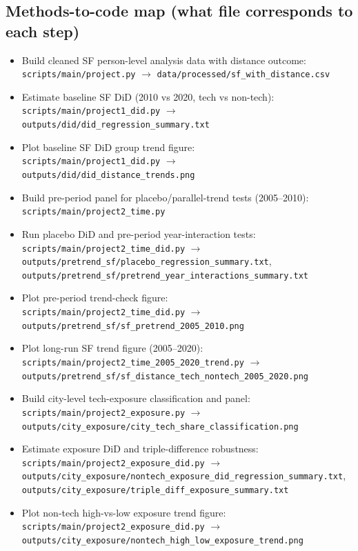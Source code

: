 \documentclass[12pt]{article}
\begin{document}
\subsection*{Methods-to-code map (what file corresponds to each step)}
\begin{itemize}[leftmargin=*]
\item Build cleaned SF person-level analysis data with distance outcome:
\\ \texttt{scripts/main/project.py} $\rightarrow$ \texttt{data/processed/sf\_with\_distance.csv}
\item Estimate baseline SF DiD (2010 vs 2020, tech vs non-tech):
\\ \texttt{scripts/main/project1\_did.py} $\rightarrow$ \texttt{outputs/did/did\_regression\_summary.txt}
\item Plot baseline SF DiD group trend figure:
\\ \texttt{scripts/main/project1\_did.py} $\rightarrow$ \texttt{outputs/did/did\_distance\_trends.png}
\item Build pre-period panel for placebo/parallel-trend tests (2005--2010):
\\ \texttt{scripts/main/project2\_time.py}
\item Run placebo DiD and pre-period year-interaction tests:
\\ \texttt{scripts/main/project2\_time\_did.py} $\rightarrow$ \texttt{outputs/pretrend\_sf/placebo\_regression\_summary.txt}, \texttt{outputs/pretrend\_sf/pretrend\_year\_interactions\_summary.txt}
\item Plot pre-period trend-check figure:
\\ \texttt{scripts/main/project2\_time\_did.py} $\rightarrow$ \texttt{outputs/pretrend\_sf/sf\_pretrend\_2005\_2010.png}
\item Plot long-run SF trend figure (2005--2020):
\\ \texttt{scripts/main/project2\_time\_2005\_2020\_trend.py} $\rightarrow$ \texttt{outputs/pretrend\_sf/sf\_distance\_tech\_nontech\_2005\_2020.png}
\item Build city-level tech-exposure classification and panel:
\\ \texttt{scripts/main/project2\_exposure.py} $\rightarrow$ \texttt{outputs/city\_exposure/city\_tech\_share\_classification.png}
\item Estimate exposure DiD and triple-difference robustness:
\\ \texttt{scripts/main/project2\_exposure\_did.py} $\rightarrow$ \texttt{outputs/city\_exposure/nontech\_exposure\_did\_regression\_summary.txt}, \texttt{outputs/city\_exposure/triple\_diff\_exposure\_summary.txt}
\item Plot non-tech high-vs-low exposure trend figure:
\\ \texttt{scripts/main/project2\_exposure\_did.py} $\rightarrow$ \texttt{outputs/city\_exposure/nontech\_high\_low\_exposure\_trend.png}
\end{itemize}
\end{document}
